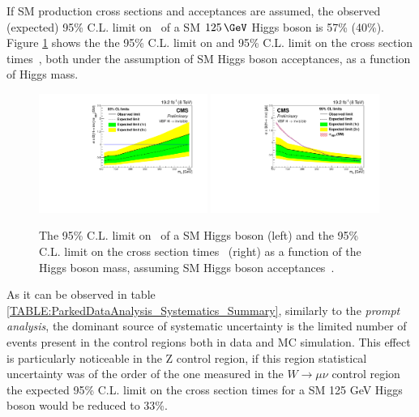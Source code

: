 If \gls{SM} production cross sections and acceptances are assumed, the observed (expected) 95\% C.L. limit on \BRinv\, of a \gls{SM} $125\,\GeV$ Higgs boson is 57\% (40\%). Figure \ref{FIGURE:ParkedDataAnalysis_Limits_VBFLimit} shows the the 95\% C.L. limit on \BRinv and 95\% C.L. limit on the cross section times \BRinv\,, both under the assumption of \gls{SM} Higgs boson acceptances, as a function of Higgs mass.

\begin{figure}[!htb]
\centering
\includegraphics[width=0.49\textwidth]{Chapter07/Images/vbflimit.pdf}
\includegraphics[width=0.49\textwidth]{Chapter07/Images/vbfxslimit.pdf}
\caption[The 95\% C.L. limit on \BRinv\, of a SM Higgs boson and the 95\% C.L. limit on the cross section times \BRinv\ as a function of the Higgs boson mass, assuming SM Higgs boson acceptances.]
{The 95\% C.L. limit on \BRinv\, of a SM Higgs boson (left) and the 95\% C.L. limit on the cross section times \BRinv\ (right) as a function of the Higgs boson mass, assuming SM Higgs boson acceptances~\cite{ARTICLE:CMSVBFHiggsInvisibleParkedAnalysisPAS}.}
\label{FIGURE:ParkedDataAnalysis_Limits_VBFLimit}
\end{figure}

As it can be observed in table \ref{TABLE:ParkedDataAnalysis_Systematics_Summary}, similarly to the \textit{prompt analysis}, the dominant source of systematic uncertainty is the limited number of events present in the control regions both in data and \gls{MC} simulation. This effect is particularly noticeable in the Z control region, if this region statistical uncertainty was of the order of the one measured in the $W\rightarrow\mu\nu$ control region the expected 95\% C.L. limit on the cross section times \BRinv for a \gls{SM} 125 GeV Higgs boson would be reduced to 33\%.

